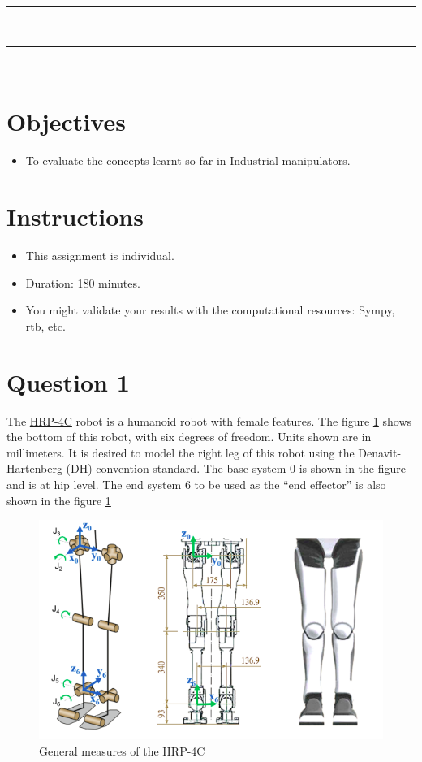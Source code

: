 \documentclass[letterpaper,pdftex]{article}
\begin{document}
\noindent
\textcolor{gray}{\rule{\textwidth}{0.5pt}}\\
\renewcommand{\tablename}{Tabla}
\renewcommand{\arraystretch}{1.2}
\renewcommand\contentsname{Contents}
\tableofcontents

\noindent
\textcolor{gray}{\rule{\textwidth}{0.5pt}}\\

\section{Objectives}
\begin{itemize}
\item To evaluate the concepts learnt so far in Industrial manipulators.
\end{itemize}

\section{Instructions}
\begin{itemize}
\item This assignment is individual.
\item Duration: 180 minutes.
\item You might validate your results with the computational resources: Sympy, rtb, etc.
\end{itemize}

\section{Question 1}


The \href{https://robots.ieee.org/robots/hrp4c/}{HRP-4C} robot is a humanoid robot with female features. The figure \ref{fig:HRP} shows the bottom of this robot, with six degrees of freedom. Units shown are in millimeters. It is desired to model the right leg of this robot using the Denavit-Hartenberg (DH) convention standard. The base system {0} is shown in the figure and is at hip level. The end system {6} to be used as the “end effector” is also shown in the figure \ref{fig:HRP}

\begin{figure}[h]
\centering
\includegraphics[scale=0.7]{HRP-4C.png}
\caption{General measures of the HRP-4C}\label{fig:HRP}
\end{figure}
\end{document}

